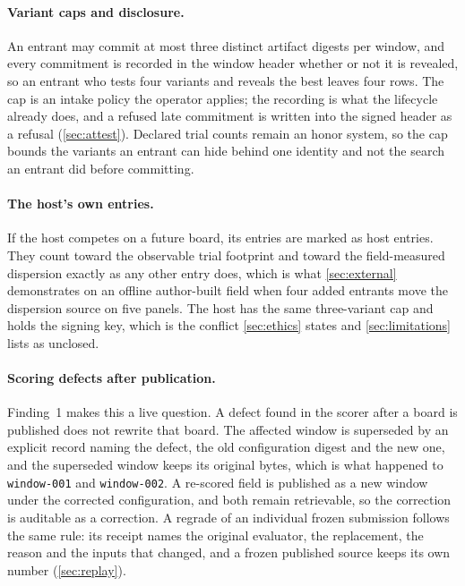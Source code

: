 \paragraph{Variant caps and disclosure.} An entrant may commit at most three distinct artifact digests per window, and every commitment is recorded in the window header whether or not it is revealed, so an entrant who tests four variants and reveals the best leaves four rows. The cap is an intake policy the operator applies; the recording is what the lifecycle already does, and a refused late commitment is written into the signed header as a refusal (\cref{sec:attest}). Declared trial counts remain an honor system, so the cap bounds the variants an entrant can hide behind one identity and not the search an entrant did before committing.

\paragraph{The host's own entries.} If the host competes on a future board, its entries are marked as host entries. They count toward the observable trial footprint and toward the field-measured dispersion exactly as any other entry does, which is what \cref{sec:external} demonstrates on an offline author-built field when four added entrants move the dispersion source on five panels. The host has the same three-variant cap and holds the signing key, which is the conflict \cref{sec:ethics} states and \cref{sec:limitations} lists as unclosed.

\paragraph{Scoring defects after publication.} Finding~1 makes this a live question. A defect found in the scorer after a board is published does not rewrite that board. The affected window is superseded by an explicit record naming the defect, the old configuration digest and the new one, and the superseded window keeps its original bytes, which is what happened to \texttt{window-001} and \texttt{window-002}. A re-scored field is published as a new window under the corrected configuration, and both remain retrievable, so the correction is auditable as a correction. A regrade of an individual frozen submission follows the same rule: its receipt names the original evaluator, the replacement, the reason and the inputs that changed, and a frozen published source keeps its own number (\cref{sec:replay}).


